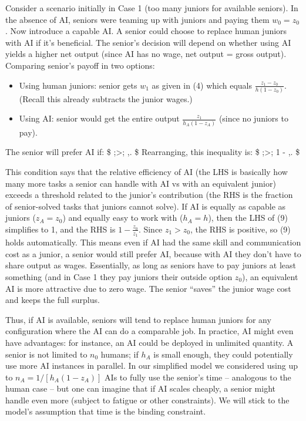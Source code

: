 \documentclass[12pt]{article}
\begin{document}
Consider a scenario initially in Case 1 (too many juniors for available
seniors). In the {absence of AI}, seniors were teaming up with
juniors and paying them \(w_0 = z_0\). Now introduce a capable AI. A
senior could choose to {replace human juniors with AI} if it's
beneficial. The senior's decision will depend on whether using AI yields
a higher net output (since AI has no wage, net output = gross output).
Comparing senior's payoff in two options:

\begin{itemize}
\tightlist
\item
  Using human juniors: senior gets \(w_1\) as given in (4) which equals
  \(\frac{z_1 - z_0}{h(1-z_0)}\). (Recall this already subtracts the
  junior wages.)
\item
  Using AI: senior would get the entire output
  \(\frac{z_1}{h_A(1-z_A)}\) (since no juniors to pay).
\end{itemize}

The senior will prefer AI if: \$ 
;\textgreater; ,. \$ Rearranging,
this inequality is: \$  ;\textgreater; 1
- ,. \$

This condition says that the {relative efficiency} of AI (the LHS
is basically how many more tasks a senior can handle with AI vs with an
equivalent junior) exceeds a threshold related to the junior's
contribution (the RHS is the fraction of senior-solved tasks that
juniors cannot solve). If AI is equally as capable as juniors
(\(z_A = z_0\)) and equally easy to work with (\(h_A = h\)), then the
LHS of (9) simplifies to 1, and the RHS is \(1 - \frac{z_0}{z_1}\).
Since \(z_1 > z_0\), the RHS is positive, so (9) holds automatically.
This means {even if AI had the same skill and communication cost as
a junior, a senior would still prefer AI}, because with AI they don't
have to share output as wages. Essentially, as long as seniors have to
pay juniors at least something (and in Case 1 they pay juniors their
outside option \(z_0\)), an equivalent AI is more attractive due to zero
wage. The senior ``saves'' the junior wage cost and keeps the full
surplus.

Thus, {if AI is available, seniors will tend to replace human
juniors} for any configuration where the AI can do a comparable job. In
practice, AI might even have advantages: for instance, an AI could be
deployed in {unlimited quantity}. A senior is not limited to
\(n_0\) humans; if \(h_A\) is small enough, they could potentially use
more AI instances in parallel. In our simplified model we considered
using up to \(n_A = 1/[h_A(1-z_A)]\) AIs to fully use the senior's time
-- analogous to the human case -- but one can imagine that if AI scales
cheaply, a senior might handle even more (subject to fatigue or other
constraints). We will stick to the model's assumption that time is the
binding constraint.
\end{document}

